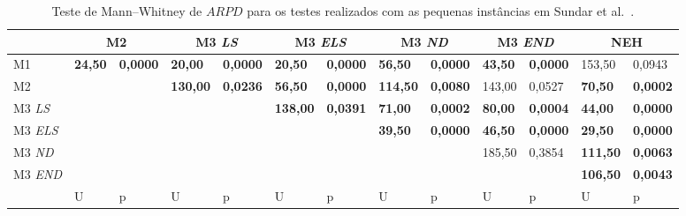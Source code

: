 \begin{table}[H]
\caption{Teste de Mann–Whitney de $ARPD$ para os testes realizados com as pequenas instâncias em Sundar et al.~\cite{sundarHybridArtificialBee2017}.}
\label{tab:P1_hipothesis_ARPD}
\setlength{\tabcolsep}{3pt} %
\begin{tabular}{l|ll|ll|ll|ll|ll|ll}
                       & \multicolumn{2}{c|}{M2}            & \multicolumn{2}{c|}{M3 \textit{LS}} & \multicolumn{2}{c|}{M3 \textit{ELS}} & \multicolumn{2}{c|}{M3 \textit{ND}} & \multicolumn{2}{c|}{M3 \textit{END}} & \multicolumn{2}{c}{NEH}          \\ \hline
M1                               & \textbf{24,50} & \textbf{0,0000} & \textbf{20,00}           & \textbf{0,0000}          & \textbf{20,50}            & \textbf{0,0000}          & \textbf{56,50}           & \textbf{0,0000}          & \textbf{43,50}           & \textbf{0,0000}           & 153,50          & 0,0943          \\
M2                               & \textbf{}      & \textbf{}       & \textbf{130,00}          & \textbf{0,0236}          & \textbf{56,50}            & \textbf{0,0000}          & \textbf{114,50}          & \textbf{0,0080}          & 143,00                   & 0,0527                    & \textbf{70,50}  & \textbf{0,0002} \\
M3 \textit{LS}  & \textbf{}      & \textbf{}       & \textbf{}                & \textbf{}                & \textbf{138,00}           & \textbf{0,0391}          & \textbf{71,00}           & \textbf{0,0002}          & \textbf{80,00}           & \textbf{0,0004}           & \textbf{44,00}  & \textbf{0,0000} \\
M3 \textit{ELS} & \textbf{}      & \textbf{}       & \textbf{}                & \textbf{}                & \textbf{}                 & \textbf{}                & \textbf{39,50}           & \textbf{0,0000}          & \textbf{46,50}           & \textbf{0,0000}           & \textbf{29,50}  & \textbf{0,0000} \\
M3 \textit{ND}  & \textbf{}      & \textbf{}       & \textbf{}                & \textbf{}                & \textbf{}                 & \textbf{}                & \textbf{}                & \textbf{}                & 185,50                   & 0,3854                    & \textbf{111,50} & \textbf{0,0063} \\
M3 \textit{END} & \textbf{}      & \textbf{}       & \textbf{}                & \textbf{}                & \textbf{}                 & \textbf{}                & \textbf{}                & \textbf{}                & \textbf{}                & \textbf{}                 & \textbf{106,50} & \textbf{0,0043} \\ \hline
                                 & U              & p               & U                        & p                        & U                         & p                        & U                        & p                        & U                        & p                         & U               & p              
\end{tabular}
\end{table}


